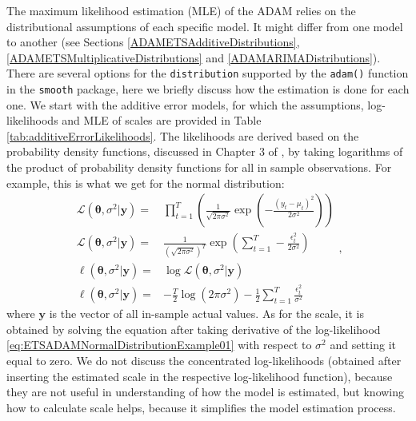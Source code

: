 \documentclass[]{book}
\theoremstyle{definition}
\theoremstyle{definition}
\theoremstyle{definition}
\theoremstyle{definition}
\theoremstyle{remark}
\begin{document}
The maximum likelihood estimation (MLE) of the ADAM relies on the distributional assumptions of each specific model. It might differ from one model to another (see Sections \ref{ADAMETSAdditiveDistributions}, \ref{ADAMETSMultiplicativeDistributions} and \ref{ADAMARIMADistributions}). There are several options for the \texttt{distribution} supported by the \texttt{adam()} function in the \texttt{smooth} package, here we briefly discuss how the estimation is done for each one. We start with the additive error models, for which the assumptions, log-likelihoods and MLE of scales are provided in Table \ref{tab:additiveErrorLikelihoods}. The likelihoods are derived based on the probability density functions, discussed in Chapter 3 of \citet{SvetunkovSBA}, by taking logarithms of the product of probability density functions for all in sample observations. For example, this is what we get for the normal distribution:
\begin{equation}
  \begin{aligned}
    \mathcal{L}(\boldsymbol{\theta}, {\sigma}^2 | \mathbf{y}) = & \prod_{t=1}^T \left(\frac{1}{\sqrt{2 \pi \sigma^2}} \exp \left( -\frac{\left(y_t -\mu_t \right)^2}{2 \sigma^2} \right)\right) \\
    \mathcal{L}(\boldsymbol{\theta}, {\sigma}^2 | \mathbf{y}) = & \frac{1}{\left(\sqrt{2 \pi \sigma^2}\right)^T} \exp \left( \sum_{t=1}^T -\frac{\epsilon_t^2}{2 \sigma^2} \right) \\
    \ell(\boldsymbol{\theta}, {\sigma}^2 | \mathbf{y}) = & \log \mathcal{L}(\boldsymbol{\theta}, {\sigma}^2 | \mathbf{y}) \\
    \ell(\boldsymbol{\theta}, {\sigma}^2 | \mathbf{y}) = & -\frac{T}{2} \log(2 \pi \sigma^2) -\frac{1}{2} \sum_{t=1}^T \frac{\epsilon_t^2}{\sigma^2}
  \end{aligned},
  \label{eq:ETSADAMNormalDistributionExample01}
\end{equation}
where \(\mathbf{y}\) is the vector of all in-sample actual values. As for the scale, it is obtained by solving the equation after taking derivative of the log-likelihood \eqref{eq:ETSADAMNormalDistributionExample01} with respect to \(\sigma^2\) and setting it equal to zero. We do not discuss the concentrated log-likelihoods (obtained after inserting the estimated scale in the respective log-likelihood function), because they are not useful in understanding of how the model is estimated, but knowing how to calculate scale helps, because it simplifies the model estimation process.
\end{document}
